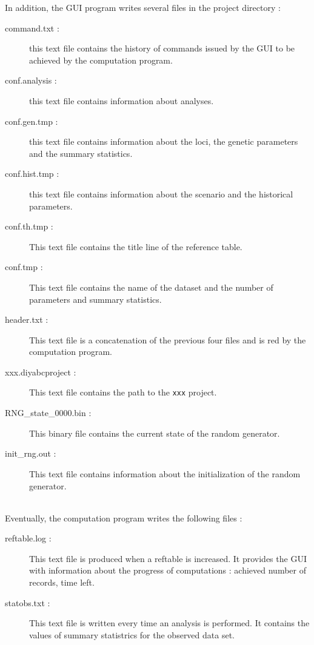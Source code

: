 In addition, the GUI program writes several files in the project directory :
\begin{description}
 \item [command.txt :] this text file contains the history of commands issued by the GUI to be achieved by the computation program.
 \item [conf.analysis :] this text file contains information about analyses.
 \item [conf.gen.tmp :] this text file contains information about the loci, the genetic parameters and the summary statistics.
 \item [conf.hist.tmp :] this text file contains information about the scenario and the historical parameters.
 \item [conf.th.tmp :] This text file contains the title line of the reference table.
 \item [conf.tmp :] This text file contains the name of the dataset and the number of parameters and summary statistics.
 \item [header.txt :] This text file is a concatenation of the previous four files and is red by the computation program.
 \item [xxx.diyabcproject :] This text file contains the path to the \texttt{xxx} project.
 \item [RNG\_state\_0000.bin :] This binary file contains the current state of the random generator.
 \item [init\_rng.out :] This text file contains information about the initialization of the random generator.
\end{description}
~\\

Eventually, the computation program writes the following files :
\begin{description}
 \item [reftable.log :] This text file is produced when a reftable is increased. It provides the GUI with information about the progress of computations : achieved number of records, time left.
 \item [statobs.txt :] This text file is written every time an analysis is performed. It contains the values of summary statistrics for the observed data set.
\end{description}

 










